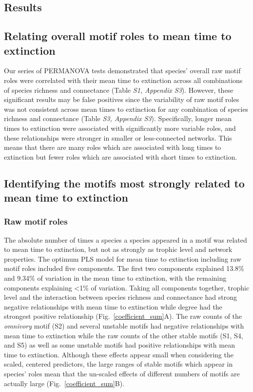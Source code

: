 \documentclass[12pt]{article}
\begin{document}
\begin{spacing}{2.0}
\section*{Results}
	
    \subsection*{Relating overall motif roles to mean time to extinction}
    
		Our series of PERMANOVA tests demonstrated that species' overall raw motif roles were correlated with their mean time to extinction across all combinations of species richness and connectance (Table \emph{S1, Appendix S3}). 
		However, these significant results may be false positives since the variability of raw motif roles was not consistent across mean times to extinction for any combination of species richness and connectance (Table \emph{S3, Appendix S3}). 
		Specifically, longer mean times to extinction were associated with significantly more variable roles, and these relationships were stronger in smaller or less-connected networks. 
		This means that there are many roles which are associated with long times to extinction but fewer roles which are associated with short times to extinction.
		
    

	\subsection*{Identifying the motifs most strongly related to mean time to extinction}

        \subsubsection*{Raw motif roles}
        
            The absolute number of times a species a species appeared in a motif was related to mean time to extinction, but not as strongly as trophic level and network properties.
            The optimum PLS model for mean time to extinction including raw motif roles included five components.
            The first two components explained 13.8\% and 9.34\% of variation in the mean time to extinction, with the remaining components explaining \textless1\% of variation.
            Taking all components together, trophic level and the interaction between species richness and connectance had strong negative relationships with mean time to extinction while degree had the strongest positive relationship (Fig.~\ref{coefficient_sum}A).
            The raw counts of the \emph{omnivory} motif (S2) and several unstable motifs had negative relationships with mean time to extinction while
            the raw counts of the other stable motifs (S1, S4, and S5) as well as some unstable motifs had positive relationships with mean time to extinction.
            Although these effects appear small when considering the scaled, centered predictors, the large ranges of stable motifs which appear in species' roles mean that the un-scaled effects of different numbers of motifs are actually large (Fig.~\ref{coefficient_sum}B).
                

\end{spacing}
\end{document}
